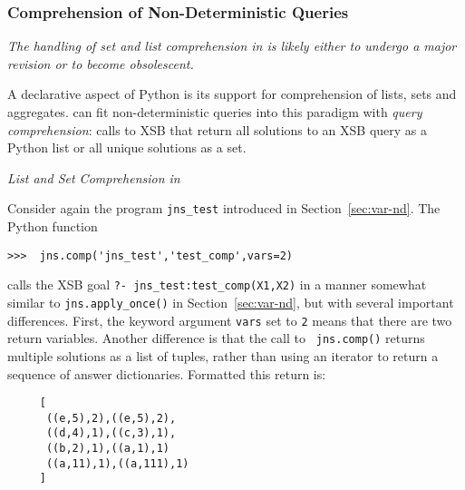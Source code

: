 \subsubsection{Comprehension of Non-Deterministic Queries} \label{sec:comp}

{\em The handling of set and list comprehension in \janus{} is likely
either to undergo a major revision or to become obsolescent.} 

A declarative aspect of Python is its support for comprehension of
lists, sets and aggregates.  \januspy{} can fit non-deterministic
queries into this paradigm with {\em query comprehension}: calls to
XSB that return all solutions to an XSB query as a Python list or all
unique solutions as a set.

\begin{example} \rm {\it List and Set Comprehension in \januspy{}} \label{ex:jns-list-comp-1}

Consider again the program {\tt jns\_test} introduced in
Section~\ref{sec:var-nd}.  The Python function



\begin{verbatim}
>>>  jns.comp('jns_test','test_comp',vars=2)
\end{verbatim}

\noindent
calls the XSB goal {\tt ?- jns\_test:test\_comp(X1,X2)} in a manner
somewhat similar to {\tt jns.apply\_once()} in
Section~\ref{sec:var-nd}, but with several important differences.
First, the keyword argument {\tt vars} set to {\tt 2} means that there
are two return variables.  Another difference is that the call to {\tt
  jns.comp()} returns multiple solutions as a list of tuples, rather
than using an iterator to return a sequence of answer dictionaries.
Formatted this return is:

{\small  
\begin{verbatim}
     [
      ((e,5),2),((e,5),2),
      ((d,4),1),((c,3),1),
      ((b,2),1),((a,1),1) 
      ((a,11),1),((a,111),1) 
     ]
\end{verbatim}
}


\end{example}
